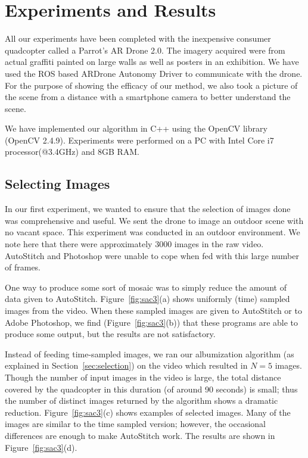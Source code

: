 \setlength{\tabcolsep}{2pt}
\section{Experiments and Results}
\label{sec:results}

All our experiments have been completed with the inexpensive consumer
quadcopter called a Parrot's AR Drone 2.0. The imagery acquired were
from actual graffiti painted on large walls as well as posters in an
exhibition.  We have used the ROS based ARDrone Autonomy
Driver to communicate with the drone. For the purpose of showing the
efficacy of our method, we also took a picture of the scene from a
distance with a smartphone camera to better understand the scene.

We have implemented our algorithm in C++ using the OpenCV library
(OpenCV 2.4.9). Experiments were performed on a PC with Intel Core i7
processor(@3.4GHz) and 8GB RAM.  

\subsection{Selecting Images}

In our first experiment, we wanted to ensure that the selection of
images done was comprehensive and useful.  We sent the drone to image 
an outdoor scene with no vacant space. This experiment was conducted
in an outdoor environment. We note here that there were approximately
3000 images in the raw video.  AutoStitch and Photoshop were unable to 
cope  when fed with this large number of frames.

One way to produce some sort of mosaic was to simply reduce the amount
of data given to AutoStitch.  Figure~\ref{fig:sac3}(a) shows uniformly
(time) sampled images from the video.  When these sampled images are
given to AutoStitch or to Adobe Photoshop, we find
(Figure~\ref{fig:sac3}(b)) that these programs are able to produce
some output, but the results are not satisfactory.

Instead of feeding time-sampled images, we ran our albumization
algorithm (as explained in Section~\ref{sec:selection}) on the video
which resulted in $N = 5$ images.  Though the number of input images
in the video is large, the total distance covered by the quadcopter in
this duration (of around 90 seconds) is small; thus the
number of distinct images returned by the algorithm shows a dramatic
reduction. Figure~\ref{fig:sac3}(c) shows examples of selected images.
Many of the images are similar to the time sampled version; however,
the occasional differences are enough to make AutoStitch work. The
results are shown in Figure~\ref{fig:sac3}(d).


